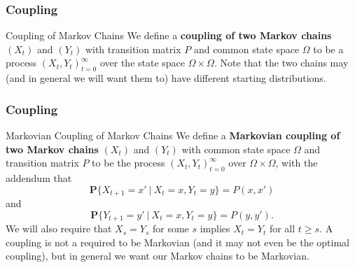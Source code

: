 \documentclass[svgnames,english]{beamer} %
\begin{document}
\begin{frame}
\frametitle{Coupling}
\begin{block}{Coupling of Markov Chains}
We define a \textbf{coupling of two Markov chains} $(X_t)$ and $(Y_t)$ with transition matrix $P$ and common state space $\Omega$ to be a process $(X_t, Y_t)_{t=0}^{\infty}$ over the state space $\Omega \times \Omega$. Note that the two chains may (and in general we will want them to) have different starting distributions.
\end{block}
\end{frame}

\begin{frame}
\frametitle{Coupling}
\begin{block}{Markovian Coupling of Markov Chains}
We define a \textbf{Markovian coupling of two Markov chains} $(X_t)$ and $(Y_t)$ with common state space $\Omega$ and transition matrix $P$ to be the process $(X_t, Y_t)_{t=0}^{\infty}$ over $\Omega \times \Omega$, with the addendum that 
\[ \mathbf{P} \{X_{t+1} = x' \ | \ X_t = x, Y_t = y\} = P(x,x') \]
and
\[ \mathbf{P} \{Y_{t+1} = y' \ | \ X_t = x, Y_t = y \} = P(y,y'). \]
We will also require that $X_s = Y_s$ for some $s$ implies $X_t = Y_t$ for all $t \geq s$. A coupling is not a required to be Markovian (and it may not even be the optimal coupling), but in general we want our Markov chains to be Markovian.   
\end{block}
\end{frame}
\end{document}
